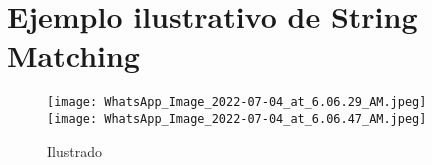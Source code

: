\section*{Ejemplo ilustrativo de String Matching}
\begin{figure} [H]
\texttt{[image: WhatsApp\_Image\_2022-07-04\_at\_6.06.29\_AM.jpeg]}
\texttt{[image: WhatsApp\_Image\_2022-07-04\_at\_6.06.47\_AM.jpeg]}
\caption{Ilustrado}
\label{fig:Il}
\end{figure}


    
